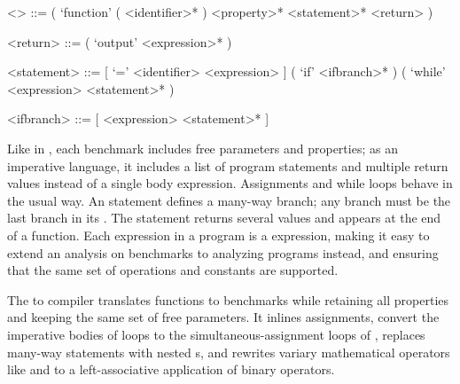 \documentclass[main.tex]{subfiles}
\begin{document}
\begin{grammar}
<\surface> ::= ( `function' ( <identifier>* ) <property>* <statement>* <return> )

<return> ::= ( `output' <expression>* )

<statement> ::= [ `=' <identifier> <expression> ]
\alt ( `if' <ifbranch>* )
\alt ( `while' <expression> <statement>* )

<ifbranch> ::= [ <expression> <statement>* ]
\end{grammar}

Like in \core, each \surface benchmark
  includes free parameters and properties;
  as an imperative language,
  it includes a list of program statements
  and multiple return values
  instead of a single body expression.
Assignments and while loops behave in the usual way.
An  statement defines a many-way branch;
  any  branch must be the last branch in its .
The  statement returns several values and appears
  at the end of a function.
Each expression in a \surface program is a \core expression,
  making it easy to extend an analysis on \core benchmarks
  to analyzing \surface programs instead,
  and ensuring that the same set of operations and constants
  are supported.

The \surface to \core compiler
  translates \surface functions to \core benchmarks
  while retaining all properties and keeping the same set of free parameters.
It inlines assignments, convert the imperative bodies of \surface loops
  to the simultaneous-assignment loops of \core,
  replaces many-way  statements with nested s,
  and rewrites variary mathematical operators like \C{+} and \C{*}
  to a left-associative application of binary operators.
\end{document}
